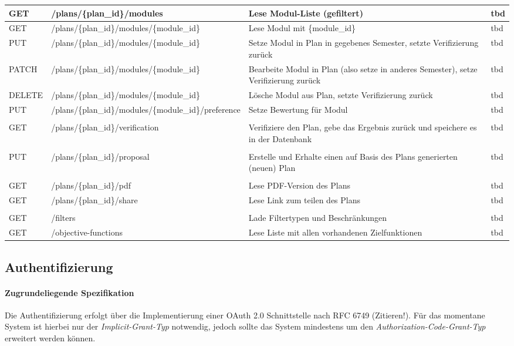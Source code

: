 \begin{tabularx}{\textwidth}{@{} | X | X | X | X | @{}}
	GET & /plans/\{plan\_id\}/modules & Lese Modul-Liste (gefiltert) & tbd \\ \hline
	GET & /plans/\{plan\_id\}/modules/\{module\_id\} & Lese Modul mit \{module\_id\} & tbd \\ \hline
	PUT & /plans/\{plan\_id\}/modules/\{module\_id\} & Setze Modul in Plan in gegebenes Semester, setzte Verifizierung zurück & tbd \\ \hline
	PATCH & /plans/\{plan\_id\}/modules/\{module\_id\} & Bearbeite Modul in Plan (also setze in anderes Semester), setze Verifizierung zurück & tbd \\ \hline
	DELETE & /plans/\{plan\_id\}/modules/\{module\_id\} & Lösche Modul aus Plan, setzte Verifizierung zurück & tbd \\ \hline
	PUT & /plans/\{plan\_id\}/modules/\{module\_id\}/preference & Setze Bewertung für Modul & tbd \\ \hline
	& & & \\ \hline
	GET & /plans/\{plan\_id\}/verification & Verifiziere den Plan, gebe das Ergebnis zurück und speichere es in der Datenbank & tbd \\ \hline
	& & & \\ \hline
	PUT & /plans/\{plan\_id\}/proposal & Erstelle und Erhalte einen auf Basis des Plans generierten (neuen) Plan & tbd \\ \hline
	& & & \\ \hline
	GET & /plans/\{plan\_id\}/pdf & Lese PDF-Version des Plans & tbd \\ \hline
	GET & /plans/\{plan\_id\}/share & Lese Link zum teilen des Plans & tbd \\ \hline
	& & & \\ \hline
	GET  & /filters & Lade Filtertypen und Beschränkungen & tbd \\ \hline
	GET & /objective-functions & Lese Liste mit allen vorhandenen Zielfunktionen & tbd \\ \hline
\end{tabularx}

\subsection{Authentifizierung}
\label{subsec:api-auth}
\paragraph{Zugrundeliegende Spezifikation} Die Authentifizierung erfolgt über die Implementierung einer OAuth 2.0 Schnittstelle nach RFC 6749 (Zitieren!).
Für das momentane System ist hierbei nur der \textit{Implicit-Grant-Typ} notwendig, jedoch sollte das System mindestens um den \textit{Authorization-Code-Grant-Typ} erweitert werden können.
